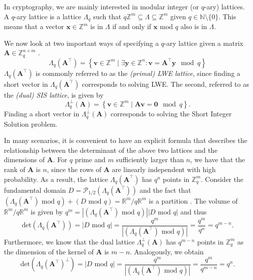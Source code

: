 In cryptography, we are mainly interested in modular integer (or $q$-ary) lattices. A $q$-ary lattice is a lattice $\Lambda_q$ such that $q\mathbb{Z}^m \subseteq	\Lambda \subseteq	\mathbb{Z}^m$ given $q \in \mathbb{N}\setminus \{0\}$. This means that a vector $\mathbf{x} \in \mathbb{Z}^m$ is in $\Lambda$ if and only if $\mathbf{x} \text{ mod } q$ also is in $\Lambda$.

We now look at two important ways of specifying a $q$-ary lattice given a matrix $\mathbf{A} \in \mathbb{Z}_q^{n\times m}$ \cite{BBGS19}.\begin{equation}\label{eq:lwe-lattice}
    \Lambda_q(\mathbf{A}^\intercal) = \left\{ \mathbf{v} \in \mathbb{Z}^m \mid \exists \mathbf{y} \in \mathbb{Z}^n : \mathbf{v} = \mathbf{A}^\intercal \mathbf{y} \mod q \right\}
\end{equation}
$\Lambda_q(\mathbf{A}^\intercal)$ is commonly referred to as the \textit{(primal) LWE lattice}, since finding a short vector in $\Lambda_q(\mathbf{A}^\intercal)$ corresponds to solving LWE. The second, referred to as the \textit{(dual) SIS lattice}, is given by
\begin{equation}\label{eq:sis-lattice}
    \Lambda_q^\perp(\mathbf{A}) = \left\{ \mathbf{v} \in \mathbb{Z}^m \mid  \mathbf{A}\mathbf{v} = \mathbf{0} \mod q \right\}.
\end{equation}
Finding a short vector in $\Lambda_q^\perp(\mathbf{A})$ corresponds to solving the Short Integer Solution problem.


In many scenarios, it is convenient to have an explicit formula that describes the relationship between the determinant of the above two lattices and the dimensions of $\mathbf{A}$. For $q$ prime and $m$ sufficiently larger than $n$, we have that the rank of $\mathbf{A}$ is $n$, since the rows of $\mathbf{A}$ are linearly independent with high probability. As a result, the lattice $\Lambda_q(\mathbf{A}^\intercal)$ has $q^n$ points in $\mathbb{Z}_q^m$.
Consider the fundamental domain $D = \mathcal{P}_{1/2}(\Lambda_q(\mathbf{A}^\intercal))$ and the fact that $(\Lambda_q(\mathbf{A}^\intercal) \text{ mod } q) + (D \text{ mod } q) = \mathbb{R}^m/q\mathbb{R}^m$ is a partition \cite{volume-lattice}. The volume of $\mathbb{R}^m/q\mathbb{R}^m$ is given by $q^m =|(\Lambda_q(\mathbf{A}^\intercal) \text{ mod } q)||D \text{ mod } q|$ and thus
\begin{equation}\label{eq:det-MR}
    \text{det}(\Lambda_q(\mathbf{A}^\intercal)) = |D \text{ mod } q| = \frac{q^m}{|(\Lambda_q(\mathbf{A}^\intercal) \text{ mod } q)|} = \frac{q^{m}}{q^{n}} = q^{m-n}.
\end{equation}
Furthermore, we know that the dual lattice  $\Lambda_q^\perp(\mathbf{A})$ has $q^{m-n}$ points in $\mathbb{Z}_q^m$ as the dimension of the kernel of $\mathbf{A}$ is $m-n$. Analogously, we obtain
\begin{equation}\label{eq:det-MR-dual}
    \text{det}(\Lambda_q(\mathbf{A}^\intercal)^{\perp}) = |D \text{ mod } q| = \frac{q^m}{|(\Lambda_q(\mathbf{A}^\intercal) \text{ mod } q)|} = \frac{q^{m}}{q^{m-n}} = q^n.
\end{equation}


